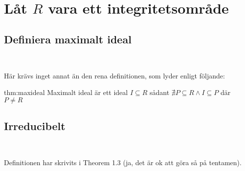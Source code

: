 \section{Låt $R$ vara ett integritetsområde}
\par\bigskip

\subsection{Definiera maximalt ideal}\hfill\\
\par\bigskip
\noindent Här krävs inget annat än den rena definitionen, som lyder enligt följande:
\par\bigskip
\begin{theo}{thm:maxideal}
  \noindent Maximalt ideal är ett ideal $I\subseteq R$ sådant $\nexists P\subseteq R\wedge I\subseteq P$ där $P\neq R$
\end{theo}
\par\bigskip

\subsection{Irreducibelt}\hfill\\
\par\bigskip
\noindent Definitionen har skrivits i Theorem 1.3 (ja, det är ok att göra så på tentamen).
\par\bigskip


